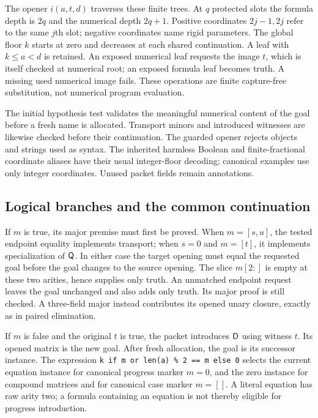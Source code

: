 The opener $i(a,t,d)$ traverses these finite trees. At $q$ protected
slots the formula depth is $2q$ and the numerical depth $2q+1$.
Positive coordinates $2j-1,2j$ refer to the same $j$th slot; negative
coordinates name rigid parameters. The global floor $k$ starts at zero
and decreases at each shared continuation. A leaf with $k\leq a<d$ is
retained. An exposed numerical leaf requests the image $t$, which is
itself checked at numerical root; an exposed formula leaf becomes truth.
A missing used numerical image fails. These operations are finite
capture-free substitution, not numerical program evaluation.

The initial hypothesis test validates the meaningful numerical content
of the goal before a fresh name is allocated. Transport minors and
introduced witnesses are likewise checked before their continuation.
The guarded opener rejects objects and strings used as syntax. The
inherited harmless Boolean and finite-fractional coordinate aliases
have their usual integer-floor decoding; canonical examples use only
integer coordinates. Unused packet fields remain annotations.

\subsection{Logical branches and the common continuation}

If $m$ is true, its major premise must first be proved. When
$m=[s,u]$, the tested endpoint equality implements transport; when
$s=0$ and $m=[t]$, it implements specialization of $\mathsf Q$.
In either case the target opening must equal the requested goal before
the goal changes to the source opening. The slice $m[2:]$ is empty at
these two arities, hence supplies only truth. An unmatched endpoint
request leaves the goal unchanged and also adds only truth. Its major
proof is still checked. A three-field major instead contributes its
opened unary closure, exactly as in paired elimination.

If $m$ is false and the original $t$ is true, the packet introduces
$\mathsf D$ using witness $t$. Its opened matrix is the new goal. After
fresh allocation, the goal is its successor instance. The expression
\texttt{k if m or len(a) \% 2 == m else 0} selects the current equation
instance for canonical progress marker $m=0$, and the zero instance for
compound matrices and for canonical case marker $m=[]$. A literal
equation has raw arity two; a formula containing an equation is not
thereby eligible for progress introduction.

